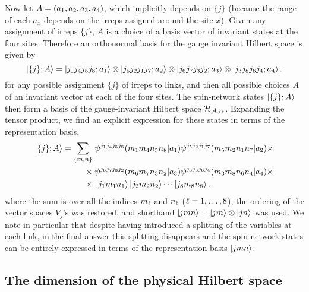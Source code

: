 Now let $A = \pqty{a_1, a_2, a_3, a_4}$, which implicitly depends on $\{j\}$ (because the range of each $a_x$ depends on the \acp{irrep} assigned around the site $x$).
Given any assignment of \acp{irrep} $\{j\}$, $A$ is a choice of a basis vector of invariant states at the four sites.
Therefore an orthonormal basis for the gauge invariant Hilbert space is given by
\begin{equation}
    \ket{ \{j\};A} =
        \ket{j_{1} j_{4} j_{5} j_{8}; a_{1}} \otimes
        \ket{j_{5} j_{2} j_{1} j_{7}; a_{2}} \otimes
        \ket{j_{6} j_{7} j_{3} j_{2}; a_{3}} \otimes
        \ket{j_{3} j_{8} j_{6} j_{4}; a_{4}}.
\end{equation}
for any possible assignment $\{j\}$ of irreps to links, and then all possible choices $A$ of an invariant vector at each of the four sites. The spin-network states $\ket{ \{j\};A}$ then form a basis of the gauge-invariant Hilbert space $\mathcal{H}_{\text{phys}}$.
Expanding the tensor product, we find an explicit expression for these states in terms of the representation basis,
\begin{align}
    \begin{split}
        \ket{ \{j\};A}
        = \sum_{ \{m,n\} }
               & \; \psi^{ j_{1} j_{4} j_{5} j_{8} }( m_{1} m_{4} n_{5} n_{8} | a_{1} ) \psi^{ j_{5} j_{2} j_{1} j_{7} }( m_{5} m_{2} n_{1} n_{7} | a_{2} ) \times \\
        \times & \; \psi^{ j_{6} j_{7} j_{3} j_{2} }( m_{6} m_{7} n_{3} n_{2} | a_{3} ) \psi^{ j_{3} j_{8} j_{6} j_{4} }( m_{3} m_{8} n_{6} n_{4} | a_{4} ) \times \\
        \times & \; \ket{j_{1} m_{1} n_{1}} \ket{j_{2} m_{2} n_{2}} \cdots \ket{j_{8} m_{8} n_{8}}.
    \end{split}
    \label{eq:spin network states 2x2}
\end{align}
where the sum is over all the indices $m_{\ell}$ and $n_{\ell}$ ($\ell = 1, \dots, 8$), the ordering of the vector spaces $V_j$'s was restored, and shorthand $\ket{jmn}=\ket{jm}\otimes \ket{jn}$ was used.
We note in particular that despite having introduced a splitting of the variables at each link, in the final answer this splitting disappears and the spin-network states can be  entirely expressed in terms of the representation basis $\ket{jmn}$.

\subsection{The dimension of the physical Hilbert space}
\label{sub:dimension_physical_hilbert_space}


